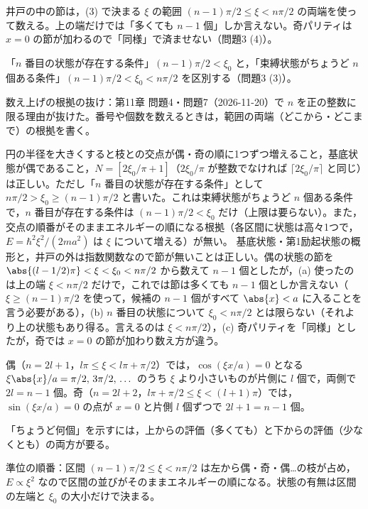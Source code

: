 \begin{daiji}
  \item 井戸の中の節は，(3) で決まる $\xi$ の範囲 $(n-1)\pi/2\le\xi<n\pi/2$ の両端を使って数える。上の端だけでは「多くても $n-1$ 個」しか言えない。奇パリティは $x=0$ の節が加わるので「同様」で済ませない（問題3 (4)）。
  \item 「$n$ 番目の状態が存在する条件」$(n-1)\pi/2<\xi_{0}$ と，「束縛状態がちょうど $n$ 個ある条件」$(n-1)\pi/2<\xi_{0}<n\pi/2$ を区別する（問題3 (3)）。
\end{daiji}
\begin{maemo}
  \item 数え上げの根拠の抜け：第11章 問題4・問題7（2026-11-20）で $n$ を正の整数に限る理由が抜けた。番号や個数を数えるときは，範囲の両端（どこから・どこまで）の根拠を書く。
\end{maemo}
\begin{kotaeran}
   円の半径を大きくすると枝との交点が偶・奇の順に1つずつ増えること，基底状態が偶であること，$N=[2\xi_{0}/\pi+1]$（$2\xi_{0}/\pi$ が整数でなければ $\lceil 2\xi_{0}/\pi\rceil$ と同じ）は正しい。ただし「$n$ 番目の状態が存在する条件」として $n\pi/2>\xi_{0}\ge(n-1)\pi/2$ と書いた。これは束縛状態がちょうど $n$ 個ある条件で，$n$ 番目が存在する条件は $(n-1)\pi/2<\xi_{0}$ だけ（上限は要らない）。また，交点の順番がそのままエネルギーの順になる根拠（各区間に状態は高々1つで，$E=\hbar^{2}\xi^{2}/(2ma^{2})$ は $\xi$ について増える）が無い。
   基底状態・第1励起状態の概形と，井戸の外は指数関数なので節が無いことは正しい。偶の状態の節を $\abs{(l-1/2)\pi}<\xi<\xi_{0}<n\pi/2$ から数えて $n-1$ 個としたが，(a) 使ったのは上の端 $\xi<n\pi/2$ だけで，これでは節は多くても $n-1$ 個としか言えない（$\xi\ge(n-1)\pi/2$ を使って，候補の $n-1$ 個がすべて $\abs{x}<a$ に入ることを言う必要がある），(b) $n$ 番目の状態について $\xi_{0}<n\pi/2$ とは限らない（それより上の状態もあり得る。言えるのは $\xi<n\pi/2$），(c) 奇パリティを「同様」としたが，奇では $x=0$ の節が加わり数え方が違う。
\end{kotaeran}
\begin{rikai}
  \item 偶（$n=2l+1$，$l\pi\le\xi<l\pi+\pi/2$）では，$\cos(\xi x/a)=0$ となる $\xi\abs{x}/a=\pi/2,\,3\pi/2,\,\dots$ のうち $\xi$ より小さいものが片側に $l$ 個で，両側で $2l=n-1$ 個。奇（$n=2l+2$，$l\pi+\pi/2\le\xi<(l+1)\pi$）では，$\sin(\xi x/a)=0$ の点が $x=0$ と片側 $l$ 個ずつで $2l+1=n-1$ 個。
  \item 「ちょうど何個」を示すには，上からの評価（多くても）と下からの評価（少なくとも）の両方が要る。
  \item 準位の順番：区間 $(n-1)\pi/2\le\xi<n\pi/2$ は左から偶・奇・偶…の枝が占め，$E\propto\xi^{2}$ なので区間の並びがそのままエネルギーの順になる。状態の有無は区間の左端と $\xi_{0}$ の大小だけで決まる。
\end{rikai}
